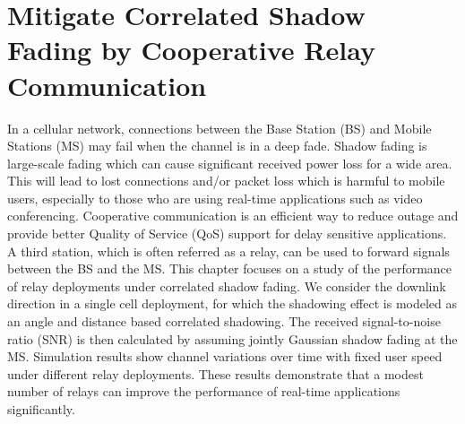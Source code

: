 \chapter{Mitigate Correlated Shadow Fading by Cooperative Relay Communication}\label{ch:2}
\par In a cellular network, connections between the Base Station (BS) and Mobile Stations (MS) may fail when the channel is in a deep fade. Shadow fading is large-scale fading which can cause significant received power loss for a wide area. This will lead to lost connections and/or packet loss which is harmful to mobile users, especially to those who are using real-time applications such as video conferencing. Cooperative communication is an efficient way to reduce outage and provide better Quality of Service (QoS) support for delay sensitive applications. A third station, which is often referred as a relay, can be used to forward signals between  the BS and the MS. This chapter focuses on a study of the performance of relay deployments under correlated shadow fading. We consider the downlink direction in a single cell deployment, for which the shadowing effect is modeled as an angle and distance  based correlated shadowing. The received signal-to-noise ratio (SNR) is then calculated by assuming jointly Gaussian shadow fading at the MS. Simulation results show channel variations over time with fixed user speed under different relay deployments. These results demonstrate that a modest number of relays can improve the performance of real-time applications significantly.

